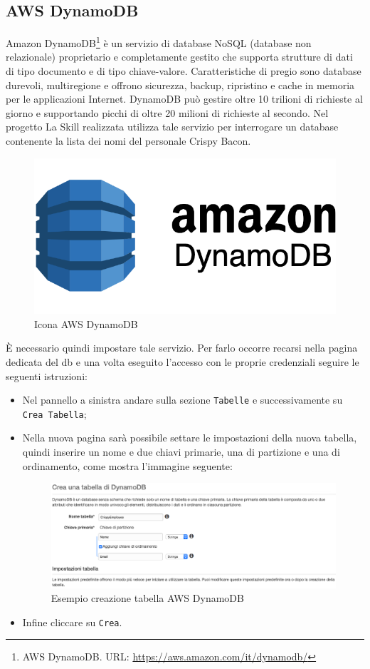 \subsection{AWS DynamoDB}
Amazon DynamoDB\footnote{AWS DynamoDB. URL: \href{https://aws.amazon.com/it/dynamodb/}{https://aws.amazon.com/it/dynamodb/}} è un servizio di database NoSQL (database non relazionale) proprietario e completamente gestito che supporta strutture di dati di tipo documento e di tipo chiave-valore. Caratteristiche di pregio sono database durevoli, multiregione e offrono sicurezza, backup, ripristino e cache in memoria per le applicazioni Internet. DynamoDB può gestire oltre 10 trilioni di richieste al giorno e supportando picchi di oltre 20 milioni di richieste al secondo. Nel progetto La Skill realizzata utilizza tale servizio per interrogare un database contenente la lista dei nomi del personale Crispy Bacon. 
\begin{figure}[H] 
    \centering 
    \includegraphics[width=0.8\columnwidth]{immagini/amazon-dynamodb.png}
    \caption{\label{fig:icona_aws_dynamo}Icona AWS DynamoDB}
\end{figure}
\noindent È necessario quindi impostare tale servizio. Per farlo occorre recarsi nella pagina dedicata del db e una volta eseguito l'accesso con le proprie credenziali seguire le seguenti istruzioni:
\begin{itemize}
	\item Nel pannello a sinistra andare sulla sezione \texttt{Tabelle} e successivamente su \texttt{Crea Tabella};
	\item Nella nuova pagina sarà possibile settare le impostazioni della nuova tabella, quindi inserire un nome e due chiavi primarie, una di partizione e una di ordinamento, come mostra l'immagine seguente:
	\begin{figure}[H] 
        \centering 
        \includegraphics[width=1\columnwidth]{immagini/aws_dynamo.png}
	    \caption{\label{fig:esempio_aws_dynamo}Esempio creazione tabella AWS DynamoDB}
    \end{figure}
	
	\item Infine cliccare su \texttt{Crea}.
\end{itemize}

